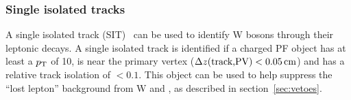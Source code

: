 \subsubsection{Single isolated tracks\label{sec:recSIT}}

A single isolated track (SIT)~\cite{singleleptonstop} can be used to 
identify W bosons through their leptonic decays. A single isolated track 
is identified if a charged PF object has at least a $p_{\mathrm{T}}$ of 10\gev, 
is near the primary vertex ($\Delta z (\textrm{track,PV}) <0.05\,\text{cm}$) 
and has a relative track isolation of $<0.1$. This object can be
used to help suppress the ``lost lepton'' background from W and
\ttbar, as described in section~\ref{sec:vetoes}. 


